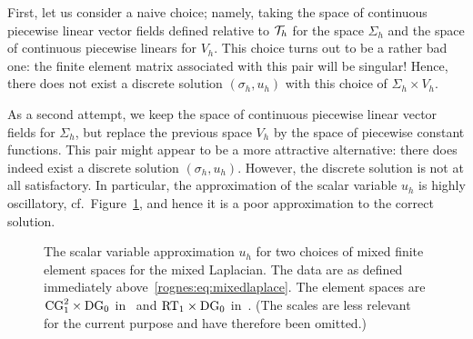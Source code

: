 First, let us consider a naive choice; namely, taking the space of
continuous piecewise linear vector fields defined relative to
$\mathcal{T}_h$ for the space $\Sigma_h$ and the space of continuous
piecewise linears for $V_h$. This choice turns out to be a rather bad
one: the finite element matrix associated with this pair will be
singular! Hence, there does not exist a discrete solution $(\sigma_h,
u_h)$ with this choice of $\Sigma_h \times V_h$.

As a second attempt, we keep the space of continuous piecewise linear
vector fields for $\Sigma_h$, but replace the previous space $V_h$ by
the space of piecewise constant functions. This pair might appear to
be a more attractive alternative: there does indeed exist a discrete
solution $(\sigma_h, u_h)$. However, the discrete solution is not at
all satisfactory. In particular, the approximation of the scalar
variable $u_h$ is highly oscillatory,
cf.~Figure~\ref{rognes:fig:example}, and hence
it is a poor approximation to the correct solution.
\begin{figure}%
  \begin{center}
    \caption{The scalar variable approximation $u_h$ for two choices
      of mixed finite element spaces for the mixed Laplacian. The data
      are as defined immediately above~\eqref{rognes:eq:mixedlaplace}.
      The element spaces are $\mathrm{CG}_1^2 \times \mathrm{DG}_0$
      in~ and $\mathrm{RT}_1 \times \mathrm{DG}_0$
      in~. (The scales are less relevant for the
      current purpose and have therefore been omitted.)}
    \label{rognes:fig:example}
  \end{center}
\end{figure}

